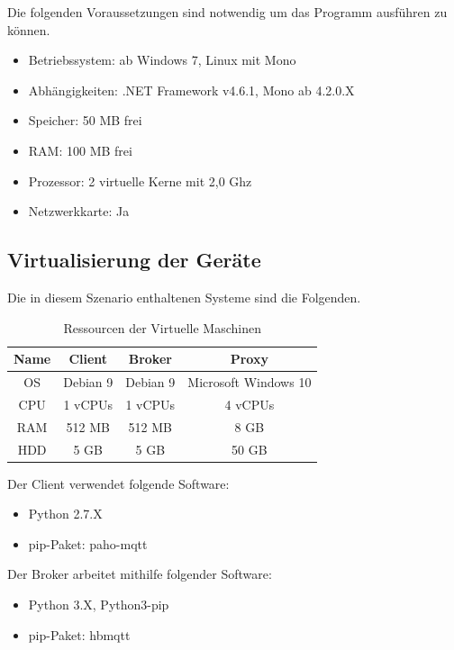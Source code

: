     Die folgenden Voraussetzungen sind notwendig um das Programm ausführen zu können.
    \begin{itemize}
        \item Betriebssystem: ab Windows 7, Linux mit Mono
        \item Abhängigkeiten: .NET Framework v4.6.1, Mono ab 4.2.0.X
        \item Speicher: 50 MB frei
        \item RAM: 100 MB frei
        \item Prozessor: 2 virtuelle Kerne  mit 2,0 Ghz
        \item Netzwerkkarte: Ja
    \end{itemize}
    
    \subsection{Virtualisierung der Geräte}
    Die in diesem Szenario enthaltenen Systeme sind die Folgenden.
    \begin{table}[h]
        \centering
        \begin{tabular}{c|c|c|c}
            Name & Client & Broker & Proxy \\ \hline
            OS & Debian 9 & Debian 9 & Microsoft Windows 10 \\
            CPU & 1 vCPUs & 1 vCPUs & 4 vCPUs \\
            RAM & 512 MB & 512 MB & 8 GB \\
            HDD & 5 GB & 5 GB & 50 GB \\
        \end{tabular}
        \caption{Ressourcen der Virtuelle Maschinen}
        \label{tab:ressourcenverteilung}
    \end{table}
    
    Der Client verwendet folgende Software:
    \begin{itemize}
        \item Python 2.7.X
        \item pip-Paket: paho-mqtt
    \end{itemize}
            
    Der Broker arbeitet mithilfe folgender Software:
    \begin{itemize}
        \item Python 3.X, Python3-pip
        \item pip-Paket: hbmqtt
    \end{itemize}
            
